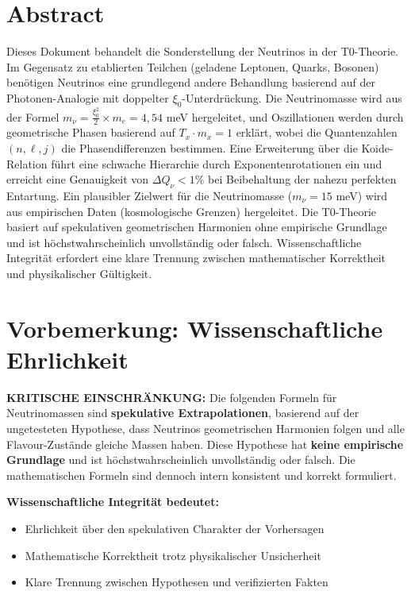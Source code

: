 \section*{Abstract}
		Dieses Dokument behandelt die Sonderstellung der Neutrinos in der T0-Theorie. Im Gegensatz zu etablierten Teilchen (geladene Leptonen, Quarks, Bosonen) benötigen Neutrinos eine grundlegend andere Behandlung basierend auf der Photonen-Analogie mit doppelter $\xi_0$-Unterdrückung. Die Neutrinomasse wird aus der Formel $m_\nu = \frac{\xi_0^2}{2} \times m_e = 4,54$ meV hergeleitet, und Oszillationen werden durch geometrische Phasen basierend auf $T_x \cdot m_x = 1$ erklärt, wobei die Quantenzahlen $(n, \ell, j)$ die Phasendifferenzen bestimmen. Eine Erweiterung über die Koide-Relation führt eine schwache Hierarchie durch Exponentenrotationen ein und erreicht eine Genauigkeit von $\Delta Q_\nu < 1\%$ bei Beibehaltung der nahezu perfekten Entartung. Ein plausibler Zielwert für die Neutrinomasse ($m_\nu = 15$ meV) wird aus empirischen Daten (kosmologische Grenzen) hergeleitet. Die T0-Theorie basiert auf spekulativen geometrischen Harmonien ohne empirische Grundlage und ist höchstwahrscheinlich unvollständig oder falsch. Wissenschaftliche Integrität erfordert eine klare Trennung zwischen mathematischer Korrektheit und physikalischer Gültigkeit.

	
	
	\section{Vorbemerkung: Wissenschaftliche Ehrlichkeit}
	
	\begin{warning}
		\textbf{KRITISCHE EINSCHRÄNKUNG:} Die folgenden Formeln für Neutrinomassen sind \textbf{spekulative Extrapolationen}, basierend auf der ungetesteten Hypothese, dass Neutrinos geometrischen Harmonien folgen und alle Flavour-Zustände gleiche Massen haben. Diese Hypothese hat \textbf{keine empirische Grundlage} und ist höchstwahrscheinlich unvollständig oder falsch. Die mathematischen Formeln sind dennoch intern konsistent und korrekt formuliert.
		
		\vspace{0.5cm}
		\textbf{Wissenschaftliche Integrität bedeutet:}
		\begin{itemize}
			\item Ehrlichkeit über den spekulativen Charakter der Vorhersagen
			\item Mathematische Korrektheit trotz physikalischer Unsicherheit
			\item Klare Trennung zwischen Hypothesen und verifizierten Fakten
		\end{itemize}
	\end{warning}
	
